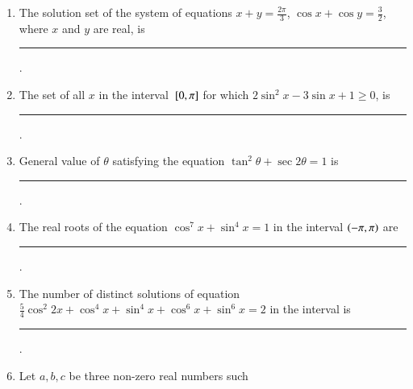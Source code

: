 \begin{enumerate}[label=\thesubsection.\arabic*,ref=\thesubsection.\theenumi]
%
    \item The solution set of the system of equations $x + y = \frac{2\pi}{3}$, $\cos x + \cos y = \frac{3}{2}$, where $x$ and $y$ are real, is \rule{1cm}{0.1pt}. 
        \hfill{}
    \item The set of all $x$ in the interval ${}\left[0,\pi\right]$ for which $2 \sin^2 x -3\sin x +1 \ge 0$,  is \rule{1cm}{0.1pt}. 

        \hfill{}
%
    \item General value of $\theta$ satisfying the equation $\tan^{2}\theta +\sec2\theta = 1$  is \rule{1cm}{0.1pt}. 
        \hfill{}
%
    \item The real roots of the equation $\cos^{7}x + \sin^{4}x = 1$ in the interval $\left(-\pi,\pi\right)$  are 
\rule{1cm}{0.1pt}. 
        \hfill{}

\item The number of distinct solutions of equation
$\frac{5}{4}\cos^2 2x+\cos^4 x+\sin^4 x+\cos^6 x+\sin^6 x=2$
in the interval   is \rule{1cm}{0.1pt}.\hfill{} 
\item Let $a, b, c$ be three non-zero real numbers such


\end{enumerate}
